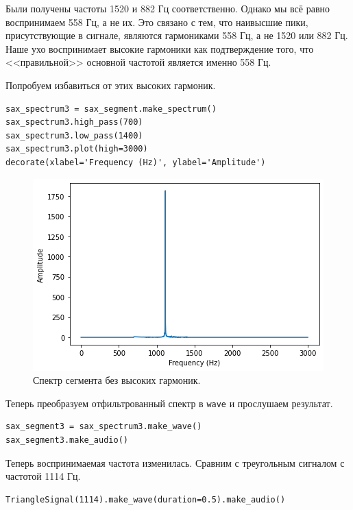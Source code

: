 \documentclass[a4paper, 14pt]{extarticle}
\begin{document}
    Были получены частоты 1520 и 882 Гц соответственно. Однако мы всё равно воспринимаем 558 Гц, а не их.
    Это связано с тем, что наивысшие пики, присутствующие в сигнале, являются гармониками 558 Гц, а не 1520 или 882 Гц.
    Наше ухо воспринимает высокие гармоники как подтверждение того, что <<правильной>> основной частотой является
    именно 558 Гц.

    Попробуем избавиться от этих высоких гармоник.

    \begin{lstlisting}[caption= Фильтрация высоких гармоник., label={lst:task4_filter_harmonics}]
sax_spectrum3 = sax_segment.make_spectrum()
sax_spectrum3.high_pass(700)
sax_spectrum3.low_pass(1400)
sax_spectrum3.plot(high=3000)
decorate(xlabel='Frequency (Hz)', ylabel='Amplitude')   \end{lstlisting}

    \begin{figure}[h]
        \centering
        \includegraphics[width=0.8\linewidth]{resources/Images/task4_spectrum_without_harmonics}
        \caption{Спектр сегмента без высоких гармоник.}
        \label{fig:task4_spectrum_without_harmonics}
    \end{figure}

    Теперь преобразуем отфильтрованный спектр в \texttt{wave} и прослушаем результат.

    \begin{lstlisting}[caption= Получение \texttt{wave}., label={lst:task4_filter_harmonics}]
sax_segment3 = sax_spectrum3.make_wave()
sax_segment3.make_audio()   \end{lstlisting}

    Теперь воспринимаемая частота изменилась. Сравним с треугольным сигналом с частотой 1114 Гц.

    \begin{lstlisting}[caption= Треугольный сигнал с частотой 1114 Гц., label={lst:task4_triangle2}]
TriangleSignal(1114).make_wave(duration=0.5).make_audio()   \end{lstlisting}
\end{document}
